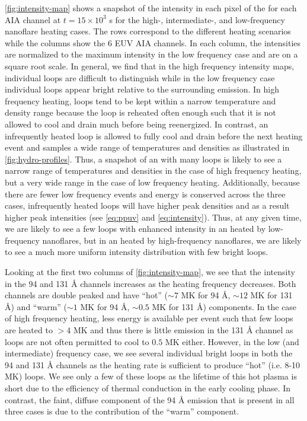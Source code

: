 \autoref{fig:intensity-map} shows a snapshot of the intensity in each pixel of the \AR{} for each AIA channel at $t=15\times10^3$ s for the high-, intermediate-, and low-frequency nanoflare heating cases. The rows correspond to the different heating scenarios while the columns show the 6 EUV AIA channels. In each column, the intensities are normalized to the maximum intensity in the low frequency case and are on a square root scale. In general, we find that in the high frequency intensity maps, individual loops are difficult to distinguish while in the low frequency case individual loops appear bright relative to the surrounding emission. In high frequency heating, loops tend to be kept within a narrow temperature and density range because the loop is reheated often enough such that it is not allowed to cool and drain much before being reenergized. In contrast, an infrequently heated loop is allowed to fully cool and drain before the next heating event and samples a wide range of temperatures and densities as illustrated in \autoref{fig:hydro-profiles}. Thus, a snapshot of an \AR{} with many loops is likely to see a narrow range of temperatures and densities in the case of high frequency heating, but a very wide range in the case of low frequency heating. Additionally, because there are fewer low frequency events and energy is conserved across the three cases, infrequently heated loops will have higher peak densities and as a result higher peak intensities (see \autoref{eq:ppuv} and \ref{eq:intensity}). Thus, at any given time, we are likely to see a few loops with enhanced intensity in an \AR{} heated by low-frequency nanoflares, but in an \AR{} heated by high-frequency nanoflares, we are likely to see a much more uniform intensity distribution with few bright loops.

Looking at the first two columns of \autoref{fig:intensity-map}, we see that the intensity in the 94 and 131 \AA{} channels increases as the heating frequency decreases. Both channels are double peaked and have ``hot'' ($\sim7$ MK for 94 \AA{}, $\sim12$ MK for 131 \AA{}) and ``warm'' ($\sim1$ MK for 94 \AA{}, $\sim0.5$ MK for 131 \AA{}) components. In the case of high frequency heating, less energy is available per event such that few loops are heated to $>4$ MK and thus there is little emission in the 131 \AA{} channel as loops are not often permitted to cool to $0.5$ MK either. However, in the low (and intermediate) frequency case, we see several individual bright loops in both the 94 and 131 \AA{} channels as the heating rate is sufficient to produce ``hot'' (i.e. 8-10 MK) loops. We see only a few of these loops as the lifetime of this hot plasma is short due to the efficiency of thermal conduction in the early cooling phase. In contrast, the faint, diffuse component of the 94 \AA{} emission that is present in all three cases is due to the contribution of the ``warm'' component. 

